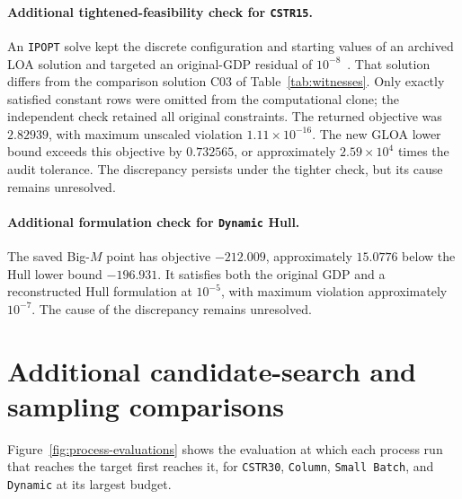 \paragraph{Additional tightened-feasibility check for \texttt{CSTR15}.}
An \texttt{IPOPT} solve kept the discrete configuration and starting values of an archived LOA solution and targeted an original-GDP residual of \(10^{-8}\)~\citep{rbfoptTestArchive}.
That solution differs from the comparison solution C03 of Table~\ref{tab:witnesses}.
Only exactly satisfied constant rows were omitted from the computational clone; the independent check retained all original constraints.
The returned objective was \(2.82939\), with maximum unscaled violation \(1.11\times10^{-16}\).
The new GLOA lower bound exceeds this objective by \(0.732565\), or approximately \(2.59\times10^4\) times the audit tolerance.
The discrepancy persists under the tighter check, but its cause remains unresolved.

\paragraph{Additional formulation check for \texttt{Dynamic} Hull.}
The saved Big-\(M\) point has objective \(-212.009\), approximately \(15.0776\) below the Hull lower bound \(-196.931\).
It satisfies both the original GDP and a reconstructed Hull formulation at \(10^{-5}\), with maximum violation approximately \(10^{-7}\).
The cause of the discrepancy remains unresolved.

\FloatBarrier
\par\endgroup

\FloatBarrier %
\section{Additional candidate-search and sampling comparisons}\label{sec:supp-additional}

Figure~\ref{fig:process-evaluations} shows the evaluation at which each process run that reaches the target first reaches it, for \texttt{CSTR30}, \texttt{Column}, \texttt{Small Batch}, and \texttt{Dynamic} at its largest budget.

